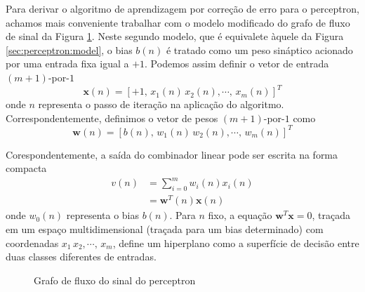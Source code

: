 Para derivar o algoritmo de aprendizagem por correção de erro para o perceptron, achamos mais conveniente trabalhar com o modelo modificado do grafo de fluxo de sinal da Figura \ref{sec:perceptron:graphmodel}. Neste segundo modelo, que é equivalete àquele da Figura \ref{sec:perceptron:model}, o bias $b(n)$ é tratado como um peso sináptico acionado por uma entrada fixa igual a $+1$. Podemos assim definir o vetor de entrada $(m+1)$-por-$1$
\begin{equation*}
  \textbf{x}(n) = \left[+1,\, x_1(n)\, x_2(n), \cdots,\, x_m(n)\right]^T
\end{equation*}
onde $n$ representa o passo de iteração na aplicação do algoritmo. Correspondentemente, definimos o vetor de pesos $(m+1)$-por-$1$ como
\begin{equation*}
  \textbf{w}(n) = \left[b(n),\, w_1(n)\, w_2(n), \cdots,\, w_m(n)\right]^T
\end{equation*}

Corespondentemente, a saída do combinador linear pode ser escrita na forma compacta
\begin{align}
  \nonumber v(n)&=\sum_{i=0}^{m}w_i(n)x_i(n)\\ 
  &=\textbf{w}^T(n)\textbf{x}(n) \label{sec:perceptron:campolocal}
\end{align}
onde $w_0(n)$ representa o bias $b(n)$. Para $n$ fixo, a equação $\textbf{w}^T\textbf{x}=0$, traçada em um espaço multidimensional (traçada para um bias determinado) com coordenadas $ x_1\, x_2, \cdots,\, x_m$, define um hiperplano como a superfície de decisão entre duas classes diferentes de entradas.

\begin{figure}[!htpb] 
  \caption{Grafo de fluxo do sinal do perceptron}
  \label{sec:perceptron:graphmodel}
\end{figure}

